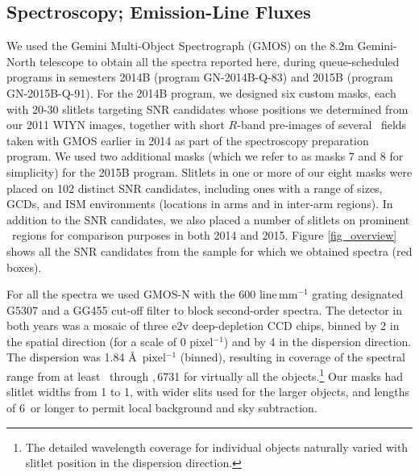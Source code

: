 
\subsection{Spectroscopy; Emission-Line Fluxes}


We used the Gemini Multi-Object Spectrograph (GMOS) on the 8.2m Gemini-North telescope to obtain all the spectra reported here, during queue-scheduled programs in semesters 2014B (program GN-2014B-Q-83) and 2015B (program GN-2015B-Q-91).  
For the 2014B program, we designed six custom masks, each with 20-30 slitlets targeting SNR candidates whose positions we determined from our 2011 WIYN images, together with  short $R$-band pre-images of several \gal\ fields taken with GMOS earlier in 2014 as part of the spectroscopy preparation program.    
We used two additional masks (which we refer to as masks 7 and 8 for simplicity)  for the 2015B program.  Slitlets in one or more of our eight masks were placed on 102 distinct SNR candidates, including ones with a range of sizes, GCDs, and ISM environments (locations in arms and in 
inter-arm regions).  In addition to the SNR candidates, we also placed a number of slitlets on prominent \hii\ regions for comparison purposes in both 2014 and 2015.
Figure \ref{fig_overview} shows all the SNR candidates from the sample for which we obtained spectra (red boxes). 

For all the spectra we used GMOS-N with the 600 line\,mm$^{-1}$ grating designated G5307 and a GG455 cut-off filter to block second-order spectra.   The detector in both years was a mosaic of three e2v deep-depletion CCD chips, binned by 2 in the spatial direction (for a scale of 0 pixel$^{-1}$) and by 4 in the dispersion direction.  
The dispersion was 1.84 \AA\,  pixel$^{-1}$ (binned), resulting in coverage of the spectral range from at least \hb\ through \sii{},\,6731 for virtually all the objects.\footnote{The detailed wavelength coverage for individual objects naturally varied with slitlet position in the dispersion direction.}  Our  masks had  slitlet  widths from 1 to 1, with wider slits used for the larger objects, and lengths of 6\arcsec\ or longer to permit local background and sky subtraction.   

